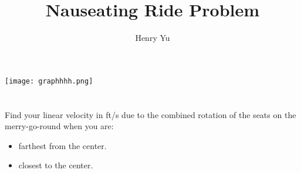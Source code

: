 \documentclass[letterpaper]{article}
\author{Henry Yu}
\title{Nauseating Ride Problem}
\date{}
\begin{document}
\maketitle

\hspace{3.8cm}
\texttt{[image: graphhhh.png]}

\section{}
Find your linear velocity in ft/s due to the combined rotation of the seats on the merry-go-round when you are:
\begin{itemize}
 \item farthest from the center.
 \item closest to the center. \vspace{6mm}


\end{itemize}
\end{document}
